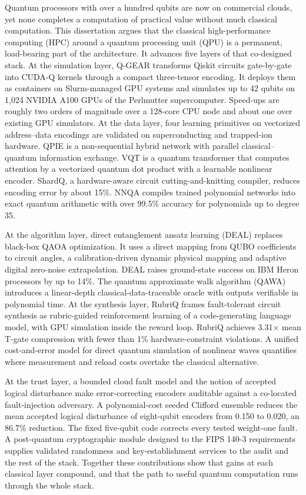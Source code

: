 \documentclass{report}
\theoremstyle{plain}
\theoremstyle{definition}
\theoremstyle{remark}
\begin{document}
Quantum processors with over a hundred qubits are now on commercial clouds, yet none completes a computation of practical value without much classical computation. This dissertation argues that the classical high-performance computing (HPC) around a quantum processing unit (QPU) is a permanent, load-bearing part of the architecture. It advances five layers of that co-designed stack. At the simulation layer, Q-GEAR transforms Qiskit circuits gate-by-gate into CUDA-Q kernels through a compact three-tensor encoding. It deploys them as containers on Slurm-managed GPU systems and simulates up to 42 qubits on 1,024 NVIDIA A100 GPUs of the Perlmutter supercomputer. Speed-ups are roughly two orders of magnitude over a 128-core CPU node and about one over existing GPU simulators. At the data layer, four learning primitives on vectorized address--data encodings are validated on superconducting and trapped-ion hardware. QPIE is a non-sequential hybrid network with parallel classical--quantum information exchange. VQT is a quantum transformer that computes attention by a vectorized quantum dot product with a learnable nonlinear encoder. ShardQ, a hardware-aware circuit cutting-and-knitting compiler, reduces encoding error by about 15\%. NNQA compiles trained polynomial networks into exact quantum arithmetic with over 99.5\% accuracy for polynomials up to degree 35.

At the algorithm layer, direct entanglement ansatz learning (DEAL) replaces black-box QAOA optimization. It uses a direct mapping from QUBO coefficients to circuit angles, a calibration-driven dynamic physical mapping and adaptive digital zero-noise extrapolation. DEAL raises ground-state success on IBM Heron processors by up to 14\%. The quantum approximate walk algorithm (QAWA) introduces a linear-depth classical-data-traceable oracle with outputs verifiable in polynomial time. At the synthesis layer, RubriQ frames fault-tolerant circuit synthesis as rubric-guided reinforcement learning of a code-generating language model, with GPU simulation inside the reward loop. RubriQ achieves 3.31$\times$ mean T-gate compression with fewer than 1\% hardware-constraint violations. A unified cost-and-error model for direct quantum simulation of nonlinear waves quantifies where measurement and reload costs overtake the classical alternative.

At the trust layer, a bounded cloud fault model and the notion of accepted logical disturbance make error-correcting encoders auditable against a co-located fault-injection adversary. A polynomial-cost seeded Clifford ensemble reduces the mean accepted logical disturbance of eight-qubit encoders from 0.150 to 0.020, an 86.7\% reduction. The fixed five-qubit code corrects every tested weight-one fault. A post-quantum cryptographic module designed to the FIPS 140-3 requirements supplies validated randomness and key-establishment services to the audit and the rest of the stack. Together these contributions show that gains at each classical layer compound, and that the path to useful quantum computation runs through the whole stack.
\end{document}
